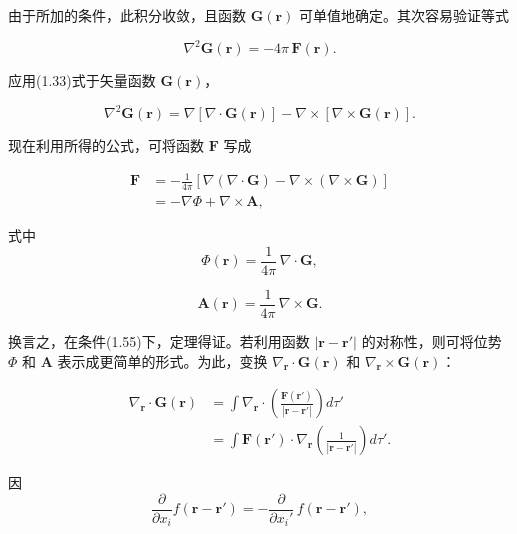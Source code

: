 \documentclass[11pt,a4paper,oneside]{ctexbook}
\newcommand{\ve}[1]{\bm{#1}}
\begin{document}
由于所加的条件，此积分收敛，且函数 $\ve{G}(\ve{r})$ 可单值地确定。其次容易验证等式

\begin{equation*}
\nabla^{2}\ve{G}(\ve{r}) = -4\pi\, \ve{F}(\ve{r}).
\end{equation*}

应用(1.33)式于矢量函数 $\ve{G}(\ve{r})$，

\begin{equation*}
\nabla^{2}\ve{G}(\ve{r}) = \nabla[\nabla \cdot \ve{G}(\ve{r})] - \nabla \times [\nabla \times \ve{G}(\ve{r})].
\end{equation*}

现在利用所得的公式，可将函数 $\ve{F}$ 写成

\begin{equation*}
\begin{aligned}
\ve{F} &= -\frac{1}{4\pi} [\nabla(\nabla \cdot \ve{G}) - \nabla \times (\nabla \times \ve{G})]\\
&= -\nabla\Phi + \nabla \times \ve{A},
\end{aligned}
\end{equation*}

式中
\begin{equation*}
\Phi(\ve{r}) = \frac{1}{4\pi}\, \nabla \cdot \ve{G},
\end{equation*}

\begin{equation*}
\ve{A}(\ve{r}) = \frac{1}{4\pi}\, \nabla \times \ve{G}.
\end{equation*}

换言之，在条件(1.55)下，定理得证。若利用函数 $|\ve{r} - \ve{r}'|$ 的对称性，则可将位势 $\Phi$ 和 $\ve{A}$ 表示成更简单的形式。为此，变换 $\nabla_{\ve{r}} \cdot \ve{G}(\ve{r})$ 和 $\nabla_{\ve{r}} \times \ve{G}(\ve{r})$：

\begin{equation*}
\begin{aligned}
\nabla_{\ve{r}} \cdot \ve{G}(\ve{r}) &= \int \nabla_{\ve{r}} \cdot \left(\frac{\ve{F}(\ve{r}')}{|\ve{r} - \ve{r}'|}\right) d\tau'\\
&= \int \ve{F}(\ve{r}') \cdot \nabla_{\ve{r}} \left(\frac{1}{|\ve{r} - \ve{r}'|}\right) d\tau'.
\end{aligned}
\end{equation*}

因
\begin{equation*}
\frac{\partial}{\partial x_i} f(\ve{r} - \ve{r}') = -\frac{\partial}{\partial x_i'}\, f(\ve{r} - \ve{r}'),
\end{equation*}
\end{document}
